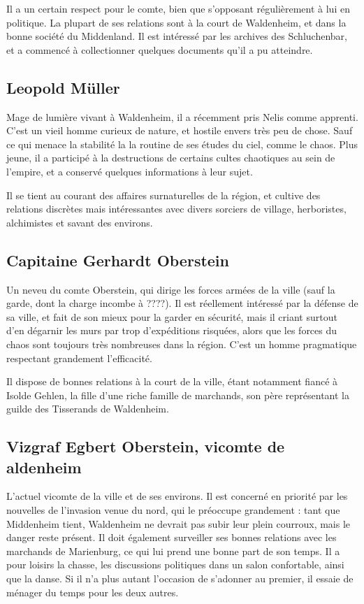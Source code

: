 \documentclass[10pt,a4paper]{book}
\begin{document}
Il a un certain respect pour le comte, bien que s'opposant régulièrement à lui en politique. La plupart de ses relations sont à la court de Waldenheim, et dans la bonne société du Middenland. Il est intéressé par les archives des Schluchenbar, et a commencé à collectionner quelques documents qu'il a pu atteindre.
\subsection{Leopold Müller}
Mage de lumière vivant à Waldenheim, il a récemment pris Nelis comme apprenti. C'est un vieil homme curieux de  nature, et hostile envers très peu de chose. Sauf ce qui menace la stabilité la la routine de ses études du ciel, comme le chaos. Plus jeune, il a participé à la destructions de certains cultes chaotiques au sein de l'empire, et a conservé quelques informations à leur sujet.

Il se tient au courant des affaires surnaturelles de la région, et cultive des relations discrètes mais intéressantes avec divers sorciers de village, herboristes, alchimistes et savant des environs.
\subsection{Capitaine Gerhardt Oberstein}
Un neveu du comte Oberstein, qui dirige les forces armées de la ville (sauf la garde, dont la charge incombe à ????). Il est réellement intéressé par la défense de sa ville, et fait de son mieux pour la garder en sécurité, mais il criant surtout d'en dégarnir les murs par trop d'expéditions risquées, alors que les forces du chaos sont toujours très nombreuses dans la région. C'est un homme pragmatique respectant grandement l'efficacité.

Il dispose de bonnes relations à la court de la ville, étant notamment fiancé à Isolde Gehlen, la fille d'une riche famille de marchands, son père représentant la guilde des Tisserands de Waldenheim.

\subsection{Vizgraf Egbert Oberstein, vicomte de aldenheim}
L'actuel vicomte de la ville et de ses environs. Il est concerné en priorité par les nouvelles de l'invasion venue du nord, qui le préoccupe grandement : tant que Middenheim tient, Waldenheim ne devrait pas subir leur plein courroux, mais le danger reste présent. Il doit également surveiller ses bonnes relations avec les marchands de Marienburg, ce qui lui prend une bonne part de son temps. Il a pour loisirs la chasse, les discussions politiques dans un salon confortable, ainsi que la danse. Si il n'a plus autant l'occasion de s'adonner au premier, il essaie de ménager du temps pour les deux autres.
\end{document}
